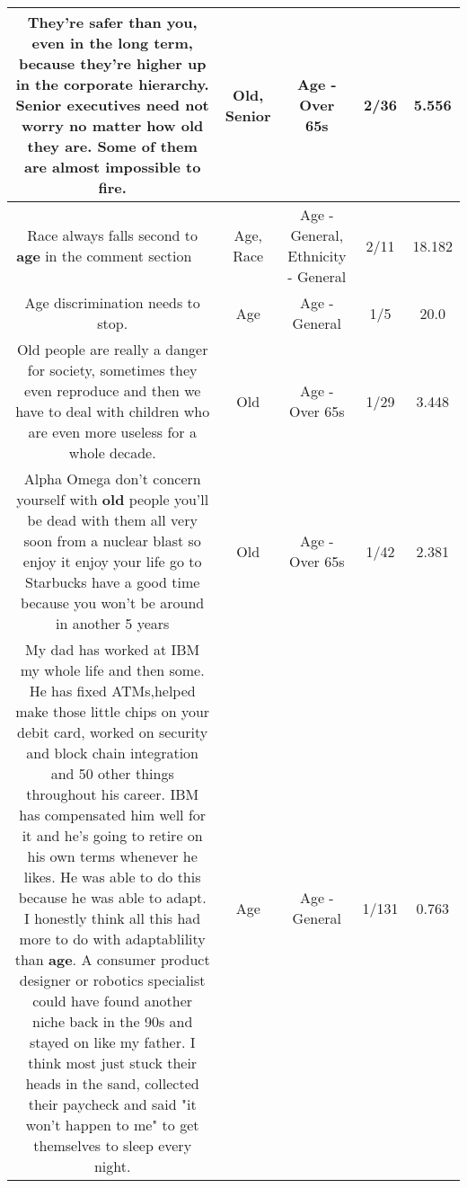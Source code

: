 \documentclass[11pt]{article}
\newlength\mylength
\begin{document}
\begin{center}
\begin{longtable}{|C{.65\mylength}|C{.30\mylength}|C{.12\mylength}|C{.12\mylength}|C{.12\mylength}|}
  \small They're safer than you, even in the long term, because they're higher up in the corporate hierarchy. \textbf{Senior} executives need not worry no matter how \textbf{old} they are. Some of them are almost impossible to fire.\normalsize   & Old, Senior & Age - Over 65s & 2/36 & 5.556 \\  \hline
  \small Race always falls second to \textbf{age} in the comment section 👴👶😂\normalsize   & Age, Race & Age - General, Ethnicity - General & 2/11 & 18.182 \\  \hline
  \small Age discrimination needs to stop.\normalsize   & Age & Age - General & 1/5 & 20.0 \\  \hline
  \small Old people are really a danger for society, sometimes they even reproduce and then we have to deal with children who are even more useless for a whole decade.\normalsize   & Old & Age - Over 65s & 1/29 & 3.448 \\  \hline
  \small Alpha Omega don't concern yourself with \textbf{old} people you'll be dead with them all very soon from a nuclear blast so enjoy it enjoy your life go to Starbucks have a good time because you won't be around in another 5 years\normalsize   & Old & Age - Over 65s & 1/42 & 2.381 \\  \hline
  \small My dad has worked at IBM my whole life and then some. He has fixed ATMs,helped make those little chips on your debit card, worked on security and block chain integration and 50 other things throughout his career. IBM has compensated him well for it and he's going to retire on his own terms whenever he likes. He was able to do this because he was able to adapt. I honestly think all this had more to do with adaptablility than \textbf{age}. A consumer product designer or robotics specialist could have found another niche back in the 90s and stayed on like my father. I think most just stuck their heads in the sand, collected their paycheck and said "it won't happen to me" to get themselves to sleep every night.\normalsize   & Age & Age - General & 1/131 & 0.763 \\  \hline

\end{longtable}
\end{center}
\end{document}
